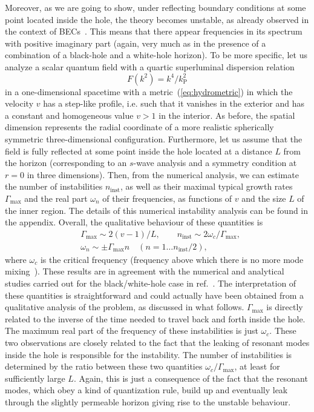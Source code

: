 \documentclass[12pt]{article}
\begin{document}
Moreover, as we are going to show, under reflecting boundary conditions at some
point located inside the hole, the theory  becomes unstable, as already observed in the context of BECs~\cite{garay-PRA,cano-barcelo}. This means that there appear frequencies in its
spectrum with positive imaginary part (again, very much
as in the presence of a combination of a black-hole and a white-hole horizon). To be more specific, let us analyze a
scalar quantum field with a quartic superluminal dispersion relation 
%
\begin{equation}\label{eq:superluminal-dispersion}
F(k^2)= k^4/k_\text{P}^2
\end{equation}
%
in a one-dimensional spacetime with a metric~(\ref{eq:hydrometric}) 
in which the velocity $v$ has a step-like profile, 
i.e. such that it vanishes in the exterior and has a constant and homogeneous value $v>1$ in the interior. As before, the spatial dimension represents the radial coordinate of a more realistic spherically symmetric three-dimensional configuration. Furthermore, let us assume that the field is fully reflected at some point inside the hole
located at a distance $L$ from the horizon (corresponding to an $s$-wave analysis and a symmetry condition at
$r=0$ in three dimensions). Then, from the numerical analysis, we can estimate the
number of instabilities  $n_\text{inst}$, as well as
their maximal typical growth rates $\Gamma_\text{max}$ and the real part
$\omega_n$ of their  frequencies, as functions of $v$ and the size $L$ of
the inner region. The details of this numerical instability analysis can be found in the appendix.
Overall, the qualitative behaviour of these quantities is 
\begin{align}
&\Gamma_\text{max}\sim2 (v-1)/L,\qquad
n_\text{inst}\sim2\omega_c /\Gamma_\text{max},\\
&
\omega_n\sim\pm\Gamma_\text{max}n\quad (n=1\ldots n_\text{inst}/2),
\end{align}
where $\omega_c$ is the critical frequency (frequency above which there is no 
more mode mixing~\cite{macher-parentani}). These results are in agreement with the numerical and analytical studies carried out for the black/white-hole case in ref.~\cite{parentani-finazzi}. 
The interpretation of these quantities is straightforward and could actually
have been obtained from a qualitative analysis of the problem, as discussed in
what follows. $\Gamma_\text{max}$ is directly related to the inverse of the time
needed to travel back and forth inside the hole. The maximum real part of the
frequency of these instabilities is just $\omega_c$. These two observations are
closely related to  the fact that the leaking of resonant modes inside the hole
is responsible for  the instability. The number of instabilities is determined
by the ratio between these two quantities $\omega_c/\Gamma_\text{max}$, at least
for sufficiently large $L$. Again, this is just a consequence of the fact that
the resonant modes, which obey a kind of quantization rule, build up and
eventually leak through the slightly permeable horizon giving rise to the
unstable behaviour. 
\end{document}
